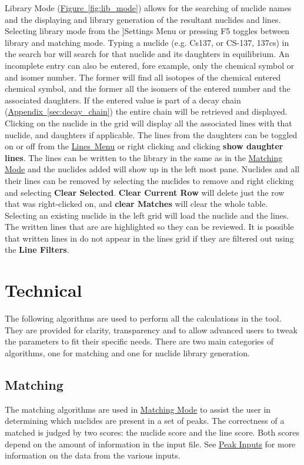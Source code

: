 \documentclass[12pt,report,justified]{SANDreport}
\begin{document}
Library Mode (\hyperref[fig:lib_mode]{Figure~\ref{fig:lib_mode}})
allows for the searching of nuclide names and the displaying and library generation of the resultant nuclides and
lines. Selecting library mode from the \hyperref[sec:set_menu]]{Settings Menu} or pressing F5 toggles between library
and matching mode. Typing a nuclide (e.g. Cs137, or CS-137, 137cs) in the search bar will search for that nuclide
and its daughters in equilibrium. An incomplete entry can also be entered, fore example, only the chemical symbol
or and isomer number. The former will find all isotopes of the chemical entered chemical symbol, and the former
all the isomers of the entered number and the associated daughters. If the entered value is part of a decay chain
(\hyperref[sec:decay_chain]{Appendix~\ref{sec:decay_chain}}) the entire chain will be
retrieved and displayed. Clicking on the nuclide in the grid will display all the associated lines with that nuclide,
and daughters if applicable. The lines from the daughters can be toggled on or off from the
\hyperref[sec:line_menu]{Lines~Menu} or right clicking and clicking \textbf{show daughter lines}. The lines can be
written to the library in the same as in the \hyperref[sec:match_mode]{Matching Mode} and the nuclides added will
show up in the left most pane. Nuclides and all their lines can be removed by selecting the nuclides to remove and
right clicking and selecting \textbf{Clear Selected}. \textbf{Clear Current Row} will delete just the row that was
right-clicked on, and \textbf{clear Matches} will clear the whole table. Selecting an existing nuclide in the left
grid will load the nuclide and the lines. The written lines that are are highlighted so they can be reviewed. It is
possible that written lines in do not appear in the lines grid if they are filtered out using the \textbf{Line Filters}.



\chapter{Technical}\label{sec:tech}
The following algorithms are used to perform all the calculations in the tool. They are provided
for clarity, transparency and to allow advanced users to tweak the parameters to fit their specific
needs. There are two main categories of algorithms, one for matching and one for nuclide library
generation.

\section{Matching}\label{sec:match}
The matching algorithms are used in \hyperref[sec:match_mode]{Matching Mode} to assist the user in
determining which nuclides are present in a set of peaks. The correctness of a matched is judged by
two scores: the nuclide score and the line score. Both scores depend on the amount of information
in the input file. See \hyperref[sec:peak_inp]{Peak Inputs} for more information on the data from the
various inputs.
\end{document}
